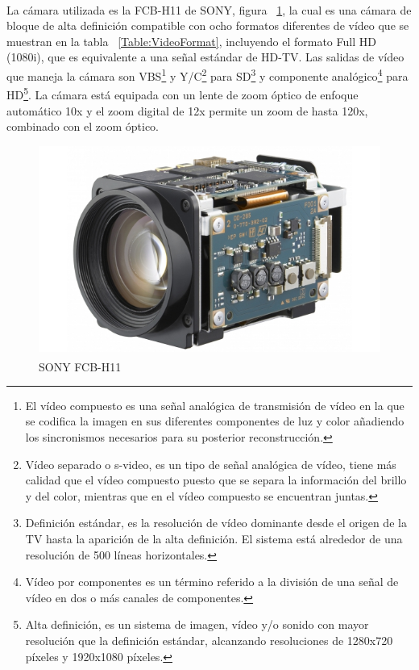 La c\'{a}mara utilizada es la FCB-H11 de SONY\textsuperscript{\textregistered}, figura ~\ref{fig:Camara}, la cual es una c\'{a}mara de bloque de alta definici\'{o}n compatible con ocho formatos diferentes de v\'{i}deo que se muestran en la tabla ~\ref{Table:VideoFormat}, incluyendo el formato Full HD (1080i), que es equivalente a una se\~{n}al est\'{a}ndar de HD-TV. Las salidas de v\'{i}deo que maneja la c\'{a}mara son VBS\footnote{El v\'{i}deo compuesto es una se\~{n}al anal\'{o}gica de transmisi\'{o}n de v\'{i}deo en la que se codifica la imagen en sus diferentes componentes de luz y color a\~{n}adiendo los sincronismos necesarios para su posterior reconstrucci\'{o}n.} y Y/C\footnote{V\'{i}deo separado o s-video, es un tipo de se\~{n}al anal\'{o}gica de v\'{i}deo, tiene m\'{a}s calidad que el v\'{i}deo compuesto puesto que se separa la informaci\'{o}n del brillo y del color, mientras que en el v\'{i}deo compuesto se encuentran juntas.} para SD\footnote{Definici\'{o}n est\'{a}ndar, es la resoluci\'{o}n de v\'{i}deo dominante desde el origen de la TV hasta la aparici\'{o}n de la alta definici\'{o}n. El sistema est\'{a} alrededor de una resoluci\'{o}n de 500 l\'{i}neas horizontales.}  y componente anal\'{o}gico\footnote{V\'{i}deo por componentes es un t\'{e}rmino referido a la divisi\'{o}n de una se\~{n}al de v\'{i}deo en dos o m\'{a}s canales de componentes.} para HD\footnote{Alta definici\'{o}n, es un sistema de imagen, v\'{i}deo y/o sonido con mayor resoluci\'{o}n que la definici\'{o}n est\'{a}ndar, alcanzando resoluciones de 1280x720 p\'{i}xeles y 1920x1080 p\'{i}xeles.}. La c\'{a}mara est\'{a} equipada con un lente de zoom \'{o}ptico de enfoque autom\'{a}tico 10x y el zoom digital de 12x permite un zoom de hasta 120x, combinado con el zoom \'{o}ptico. 

\begin{figure}[H]
\centering \includegraphics[scale=0.5]{img/Camara.jpeg}
\caption{SONY\textsuperscript{\textregistered} FCB-H11}
\label{fig:Camara}
\end{figure} 

